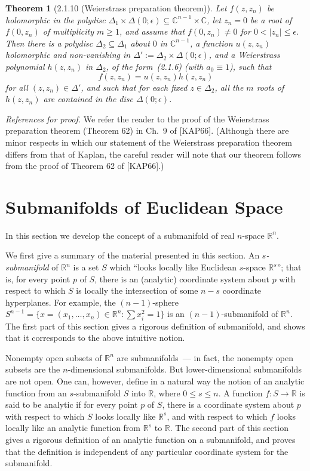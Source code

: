 \documentclass[11pt]{article}
\theoremstyle{plain}
\newtheorem*{theorem*}{Theorem}
\theoremstyle{definition}
\newcommand{\R}{\mathbb{R}}
\newcommand{\C}{\mathbb{C}}
\begin{document}
\begin{theorem*}[2.1.10 (Weierstrass preparation theorem)]
Let $f(z, z_n)$ be holomorphic in the polydisc
$\Delta_1 \times \Delta(0;\epsilon) \subseteq \C^{n-1} \times \C$, let
$z_n = 0$ be a root of $f(0, z_n)$ of multiplicity $m \ge 1$, and assume
that $f(0, z_n) \ne 0$ for $0 < |z_n| \le \epsilon$. Then there is a
polydisc $\Delta_2 \subseteq \Delta_1$ about $0$ in $\C^{n-1}$, a
function $u(z, z_n)$ holomorphic and non-vanishing in
$\Delta' := \Delta_2 \times \Delta(0;\epsilon)$, and a Weierstrass
polynomial $h(z, z_n)$ in $\Delta_2$, of the form~(2.1.6) (with
$a_0 \equiv 1$), such that
\begin{equation}
f(z, z_n) = u(z, z_n) h(z, z_n)
\tag{2.1.7}
\end{equation}
for all $(z, z_n) \in \Delta'$, and such that for each fixed
$z \in \Delta_2$, all the $m$ roots of $h(z, z_n)$ are contained in the
disc $\Delta(0;\epsilon)$.
\end{theorem*}

\textit{References for proof.} We refer the reader to the proof of the
Weierstrass preparation theorem (Theorem 62) in Ch.~9 of [KAP66].
(Although there are minor respects in which our statement of the
Weierstrass preparation theorem differs from that of Kaplan, the careful
reader will note that our theorem follows from the proof of Theorem 62
of [KAP66].)

\section{Submanifolds of Euclidean Space}

In this section we develop the concept of a submanifold of real
$n$-space $\R^n$.

We first give a summary of the material presented in this section. An
\emph{$s$-submanifold} of $\R^n$ is a set $S$ which ``looks locally like
Euclidean $s$-space $\R^s$''; that is, for every point $p$ of $S$, there
is an (analytic) coordinate system about $p$ with respect to which $S$
is locally the intersection of some $n-s$ coordinate hyperplanes. For
example, the $(n-1)$-sphere
$S^{n-1} = \{ x = (x_1, \ldots, x_n) \in \R^n : \sum x_i^2 = 1 \}$ is an
$(n-1)$-submanifold of $\R^n$. The first part of this section gives a
rigorous definition of submanifold, and shows that it corresponds to the
above intuitive notion.

Nonempty open subsets of $\R^n$ are submanifolds~--- in fact, the
nonempty open subsets are the $n$-dimensional submanifolds. But
lower-dimensional submanifolds are not open. One can, however, define in
a natural way the notion of an analytic function from an $s$-submanifold
$S$ into $\R$, where $0 \le s \le n$. A function $f: S \to \R$ is said to
be analytic if for every point $p$ of $S$, there is a coordinate system
about $p$ with respect to which $S$ looks locally like $\R^s$, and with
respect to which $f$ looks locally like an analytic function from $\R^s$
to $\R$. The second part of this section gives a rigorous definition of
an analytic function on a submanifold, and proves that the definition is
independent of any particular coordinate system for the submanifold.
\end{document}
